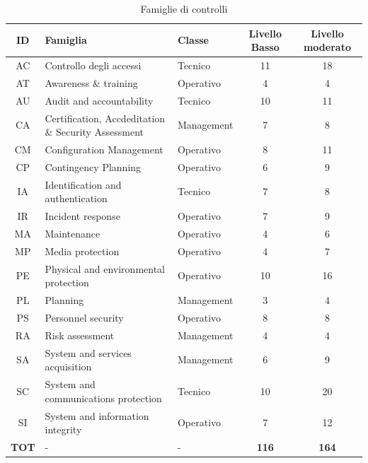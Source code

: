 \documentclass[../main.tex]{subfiles}
\begin{document}
\begin{table}[h]
    \begin{tabulary}{\textwidth}{|C|L|L|C|C|}
    \hline
    \textbf{ID}  & \textbf{Famiglia}    &  \textbf{Classe}      & \textbf{Livello Basso}     & \textbf{Livello moderato}  \\    \hline
    AC  & Controllo degli accessi & Tecnico &  11  & 18 \\    \hline
    AT  & Awareness \& training  & Operativo &   4  &  4 \\    \hline
    AU  & Audit and accountability  & Tecnico  & 10  & 11 \\    \hline
    CA  & Certification, Accdeditation \& Security Assessment & Management & 7 & 8 \\    \hline
    CM  & Configuration Management & Operativo & 8 & 11 \\ \hline 
    CP  & Contingency Planning & Operativo & 6 & 9 \\ \hline
    IA  & Identification and authentication & Tecnico & 7 & 8 \\ \hline
    IR  & Incident response & Operativo & 7 & 9 \\ \hline 
    MA  & Maintenance & Operativo & 4 & 6 \\ \hline
    MP  & Media protection & Operativo & 4 & 7\\ \hline
    PE  & Physical and environmental protection & Operativo & 10 & 16 \\ \hline
    PL  & Planning & Management & 3 & 4 \\ \hline
    PS  & Personnel security & Operativo & 8 & 8 \\ \hline
    RA  & Risk assessment & Management & 4 & 4 \\ \hline
    SA  & System and services acquisition & Management & 6 & 9\\ \hline
    SC  & System and communications protection & Tecnico & 10 &  20 \\ \hline
    SI  & System and information integrity & Operativo & 7 & 12 \\ \hline \hline
    \textbf{TOT } & - & - & \textbf{116} & \textbf{164} \\ \hline
    \end{tabulary}
    \caption{Famiglie di controlli\cite{fedrampLowSC}\cite{fedrampModSC}}\label{tab:80053fedrampfamilies}
\end{table}
\end{document}

